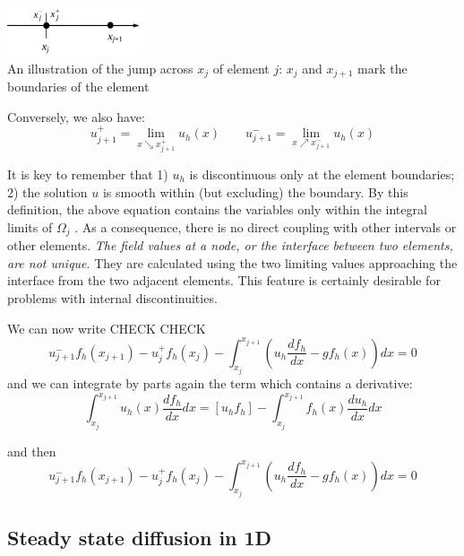 \begin{center}
\includegraphics[width=4cm]{images/dgfem/dgfem_1}\\
{\scriptsize An illustration of the jump across $x_j$ of element $j$: 
$x_j$ and $x_{j+1}$ mark the
boundaries of the element}
\end{center}

Conversely, we also have:
\begin{equation}
u_{j+1}^+ = \lim_{x \searrow x_{j+1}^+} u_h(x)
\qquad
u_{j+1}^- = \lim_{x \nearrow x_{j+1}^-} u_h(x)
\end{equation}



It is key to remember that 1) $u_h$ is discontinuous only at the element boundaries; 
2) the solution $u$ is smooth within (but excluding) the boundary. 
By this definition, the above equation contains the variables only within the integral limits of $\Omega_j$ . 
As a consequence, there is no direct coupling with other intervals or other elements. 
{\sl The field values at a node, or the interface between two elements, are not unique}. They are
calculated using the two limiting values approaching the interface from the two
adjacent elements. This feature is certainly desirable for problems with internal
discontinuities.

We can now write CHECK CHECK
\begin{equation}
u_{j+1}^- f_h(x_{j+1}) - u_j^+ f_h(x_{j}) 
-\int_{x_j}^{x_{j+1}} \left( u_h \frac{d f_h}{dx} - g f_h(x)\right)  dx = 0
\end{equation}
and we can integrate by parts again the term which contains a derivative:
\[
\int_{x_j}^{x_{j+1}} u_h(x) \frac{d f_h}{dx} dx = [u_h f_h] -  \int_{x_j}^{x_{j+1}} f_h(x) \frac{d u_h}{dx} dx 
\]

and then 
\begin{equation}
u_{j+1}^- f_h(x_{j+1}) - u_j^+ f_h(x_{j}) 
-\int_{x_j}^{x_{j+1}} \left( u_h \frac{d f_h}{dx} - g f_h(x)\right)  dx = 0
\end{equation}


\newpage
\subsection{Steady state diffusion in 1D}

